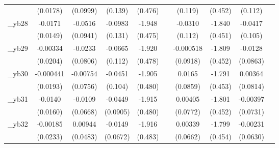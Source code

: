 \begin{table}[htbp]
\begin{tabular}{l*{9}{c}}
            &    (0.0178)         &    (0.0999)         &     (0.139)         &     (0.476)         &                     &     (0.119)         &     (0.452)         &     (0.112)         &                     \\
[1em]
\_yb28       &     -0.0171         &     -0.0516         &     -0.0983         &      -1.948\sym{***}&                     &     -0.0310         &      -1.840\sym{***}&     -0.0417         &                     \\
            &    (0.0149)         &    (0.0941)         &     (0.131)         &     (0.475)         &                     &     (0.112)         &     (0.451)         &     (0.105)         &                     \\
[1em]
\_yb29       &    -0.00334         &     -0.0233         &     -0.0665         &      -1.920\sym{***}&                     &   -0.000518         &      -1.809\sym{***}&     -0.0128         &                     \\
            &    (0.0204)         &    (0.0806)         &     (0.112)         &     (0.478)         &                     &    (0.0918)         &     (0.452)         &    (0.0863)         &                     \\
[1em]
\_yb30       &   -0.000441         &    -0.00754         &     -0.0451         &      -1.905\sym{***}&                     &      0.0165         &      -1.791\sym{***}&     0.00364         &                     \\
            &    (0.0193)         &    (0.0756)         &     (0.104)         &     (0.480)         &                     &    (0.0859)         &     (0.453)         &    (0.0814)         &                     \\
[1em]
\_yb31       &     -0.0140         &     -0.0109         &     -0.0449         &      -1.915\sym{***}&                     &     0.00405         &      -1.801\sym{***}&    -0.00397         &                     \\
            &    (0.0160)         &    (0.0668)         &    (0.0905)         &     (0.480)         &                     &    (0.0772)         &     (0.452)         &    (0.0731)         &                     \\
[1em]
\_yb32       &    -0.00185         &     0.00944         &     -0.0149         &      -1.916\sym{***}&                     &     0.00339         &      -1.799\sym{***}&    -0.00231         &                     \\
            &    (0.0233)         &    (0.0483)         &    (0.0672)         &     (0.483)         &                     &    (0.0662)         &     (0.454)         &    (0.0630)         &                     \\

\end{tabular}
\end{table}
